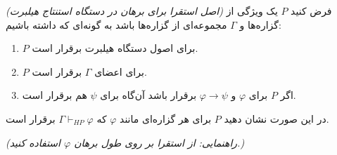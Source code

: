 \emph{(اصل استقرا برای برهان در دستگاه استنتاج هیلبرت) }
فرض کنید $P$ یک ویژگی از گزاره‌ها و $\Gamma$ مجموعه‌ای از گزاره‌ها باشد به گونه‌ای که داشته باشیم:
\begin{enumerate}
    \item $P$ برای اصول دستگاه هیلبرت برقرار است.
    \item $P$ برای اعضای $\Gamma$ برقرار است.
    \item اگر $P$ برای $\varphi$ و $\varphi \rightarrow \psi$ برقرار باشد آن‌گاه برای $\psi$ هم برقرار است.
\end{enumerate}
در این صورت نشان دهید $P$ برای هر گزاره‌ای مانند $\varphi$ که $\Gamma \vdash_{HP} \varphi$ برقرار است.

\emph{(راهنمایی: از استقرا بر روی طول برهان $\varphi$ استفاده کنید.)}
